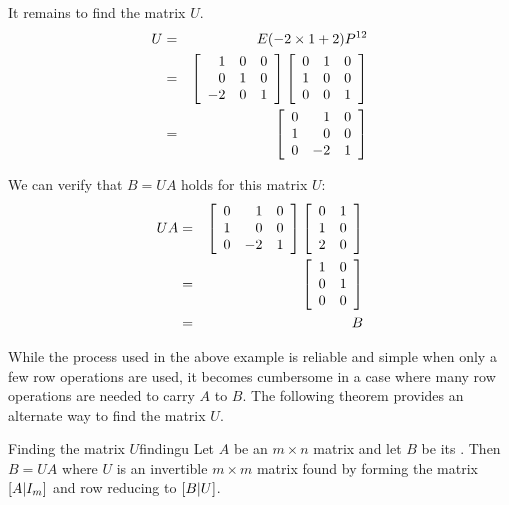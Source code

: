 \begin{solution}
It remains to find the matrix $U$. 
\begin{eqnarray*}
U &=& E(-2 \times 1 + 2) P^{12} \\
&=& \left[ \begin{array}{rrr}
1 & 0 & 0 \\
0 & 1 & 0 \\
-2 & 0 & 1 
\end{array} \right]
\left[ \begin{array}{rrr}
0 & 1 & 0 \\
1 & 0 & 0 \\
0 & 0 & 1 
\end{array} \right] \\
&=& \left[
\begin{array}{rrr}
0 & 1 & 0\\
1 & 0 & 0 \\
0 & -2  & 1 
\end{array}
\right]
\end{eqnarray*}


We can verify that $B = UA$ holds for this matrix $U$:
\begin{eqnarray*}
UA &=& \left[
\begin{array}{rrr}
0 & 1 & 0\\
1 & 0 & 0 \\
0 & -2  & 1 
\end{array}
\right]
\left[
\begin{array}{rr}
0 & 1 \\
1 & 0 \\
2 & 0
\end{array}
\right] \\
&=& \left[ \begin{array}{rr}
1 & 0 \\
0 & 1 \\
0 & 0 
\end{array} \right] \\
&=& B 
\end{eqnarray*} 
\end{solution}

While the process used in the above example is reliable and simple when only a few row operations are used, it becomes cumbersome in a case where many row operations are needed to carry $A$ to $B$. The following theorem provides an alternate way to find the matrix $U$. 

\begin{theorem}{Finding the matrix $U$}{findingu}
Let $A$ be an $m \times n$ matrix and let $B$ be its {\rref}. Then $B = UA$ where $U$ is an invertible $m \times m$ matrix found by forming the matrix $ \left[ A | I_m \right]$ and row reducing to $\left[ B | U \right]$. 
\end{theorem}

